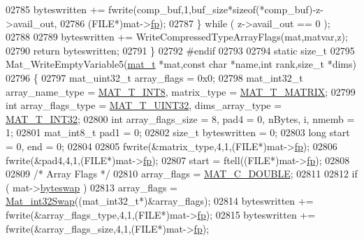 \begin{DoxyCode}
{{{{{{{{{{{{{{{{02785         byteswritten += fwrite(comp\_buf,1,buf\_size*\textcolor{keyword}{sizeof}(*comp\_buf)-z->avail\_out,
02786             (FILE*)mat->\hyperlink{struct__mat__t_a85f562e407ca9ad4d2a6e14f839432b7}{fp});
02787     \} \textcolor{keywordflow}{while} ( z->avail\_out == 0 );
02788 
02789     byteswritten += WriteCompressedTypeArrayFlags(mat,matvar,z);
02790     \textcolor{keywordflow}{return} byteswritten;
02791 \}
02792 \textcolor{preprocessor}{#endif}
02793 
02794 \textcolor{keyword}{static} \textcolor{keywordtype}{size\_t}
02795 Mat\_WriteEmptyVariable5(\hyperlink{struct__mat__t}{mat\_t} *mat,\textcolor{keyword}{const} \textcolor{keywordtype}{char} *name,\textcolor{keywordtype}{int} rank,\textcolor{keywordtype}{size\_t} *dims)
02796 \{
02797     mat\_uint32\_t array\_flags = 0x0;
02798     mat\_int32\_t  array\_name\_type = \hyperlink{group___m_a_t_ggacf7b3b879282b7ab3a51190e49bf3453a9807f5033ed4f9b548953742d9fd1658}{MAT\_T\_INT8}, matrix\_type = 
      \hyperlink{group___m_a_t_ggacf7b3b879282b7ab3a51190e49bf3453a32985fee89a4df8db4b3f5d3a48823d3}{MAT\_T\_MATRIX};
02799     \textcolor{keywordtype}{int}          array\_flags\_type = \hyperlink{group___m_a_t_ggacf7b3b879282b7ab3a51190e49bf3453aa397e285a23fe240368b752897652c6a}{MAT\_T\_UINT32}, dims\_array\_type = 
      \hyperlink{group___m_a_t_ggacf7b3b879282b7ab3a51190e49bf3453a83e06a68320726c6572bfbb9f3addb1d}{MAT\_T\_INT32};
02800     \textcolor{keywordtype}{int}          array\_flags\_size = 8, pad4 = 0, nBytes, i, nmemb = 1;
02801     mat\_int8\_t   pad1 = 0;
02802     \textcolor{keywordtype}{size\_t}       byteswritten = 0;
02803     \textcolor{keywordtype}{long}         start = 0, end = 0;
02804 
02805     fwrite(&matrix\_type,4,1,(FILE*)mat->\hyperlink{struct__mat__t_a85f562e407ca9ad4d2a6e14f839432b7}{fp});
02806     fwrite(&pad4,4,1,(FILE*)mat->\hyperlink{struct__mat__t_a85f562e407ca9ad4d2a6e14f839432b7}{fp});
02807     start = ftell((FILE*)mat->\hyperlink{struct__mat__t_a85f562e407ca9ad4d2a6e14f839432b7}{fp});
02808 
02809     \textcolor{comment}{/* Array Flags */}
02810     array\_flags = \hyperlink{group___m_a_t_ggad4d60ae7b709fc81bfd744fb4c857c40a5d70e0862e5bdb7bd86bf7ba5948f307}{MAT\_C\_DOUBLE};
02811 
02812     \textcolor{keywordflow}{if} ( mat->\hyperlink{struct__mat__t_a99d207977af5e04941ace56d71817a40}{byteswap} )
02813         array\_flags = \hyperlink{endian_8c_a2e0153996243f0a34df9a5286087cfa3}{Mat\_int32Swap}((mat\_int32\_t*)&array\_flags);
02814     byteswritten += fwrite(&array\_flags\_type,4,1,(FILE*)mat->\hyperlink{struct__mat__t_a85f562e407ca9ad4d2a6e14f839432b7}{fp});
02815     byteswritten += fwrite(&array\_flags\_size,4,1,(FILE*)mat->\hyperlink{struct__mat__t_a85f562e407ca9ad4d2a6e14f839432b7}{fp});
}}}}}}}}}}}}}}}}
\end{DoxyCode}
